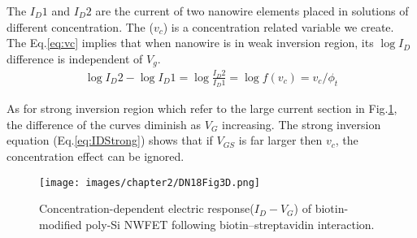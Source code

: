 The $I_D1$ and $I_D2$ are the current of two nanowire elements placed in solutions of different concentration.
The ($v_c$) is a concentration related variable we create.
The Eq.\ref{eq:vc} implies that when nanowire is in weak inversion region, its $\log I_D$ difference is independent of $V_g$.
\begin{align}
    \log I_D2 - \log I_D1 = \log \frac{I_D2}{I_D1} = \log f(v_c) = v_c / \phi_t
\end{align}

As for strong inversion region which refer to the large current section in Fig.\ref{fig:DN17Fig6d}, the difference of the curves diminish as $V_G$ increasing.
The strong inversion equation (Eq.\ref{eq:IDStrong}) shows that if $V_{GS}$ is far larger then $v_c$, the concentration effect can be ignored.

\begin{figure}[!htbp]
    \centering
    \texttt{[image: images/chapter2/DN18Fig3D.png]}
    \caption{Concentration-dependent electric response($I_D-V_G$) of biotin-modified poly-Si NWFET following biotin–streptavidin interaction.\cite{DN17}}
    \label{fig:DN17Fig6d}
\end{figure}









%
